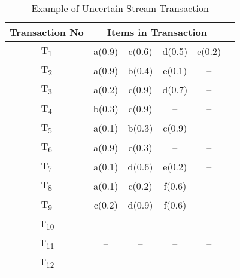 %
%
\begin{table}
\centering

\begin{tabular}{|c|c|c|c|c|c|}
\hline
	Transaction No & \multicolumn{4}{c|}{Items in Transaction} \\ \hline \hline
	T\textsubscript{1} & a(0.9) & c(0.6) & d(0.5) & e(0.2)			\\\hline
	T\textsubscript{2} & a(0.9) & b(0.4) & e(0.1) & --    			\\\hline
	T\textsubscript{3} & a(0.2) & c(0.9) & d(0.7) & --    			\\\hline
	T\textsubscript{4} & b(0.3) & c(0.9) & -- & --			\\\hline
	T\textsubscript{5} & a(0.1) & b(0.3) & c(0.9) & --    			\\\hline
	T\textsubscript{6} & a(0.9) & e(0.3) & -- & --        			\\\hline
   	T\textsubscript{7} & a(0.1) & d(0.6) & e(0.2) & --		\\\hline
	T\textsubscript{8} & a(0.1) & c(0.2) & f(0.6) & --    			\\\hline
	T\textsubscript{9} & c(0.2) & d(0.9) & f(0.6) & --    			\\\hline
	
	T\textsubscript{10} &  --  &  --  &  --  & --    				\\\hline
	T\textsubscript{11} &  --  &  --  &  --  & --    				\\\hline
	T\textsubscript{12} &  --  &  --  &  --  & --    				\\\hline
			
\end{tabular}
\label{tab:ex_u}
\caption{Example of Uncertain Stream Transaction}
\label{table:uncertain_stream_transaction}
\end{table}
%